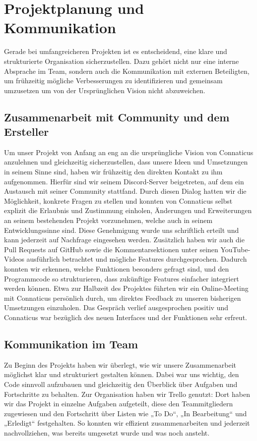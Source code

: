 \section{Projektplanung und Kommunikation}\label{sec:Absprache mit Ersteller und Community} 

Gerade bei umfangreicheren Projekten ist es entscheidend, eine klare und strukturierte Organisation
sicherzustellen. Dazu gehört nicht nur eine interne Absprache im Team, sondern auch die
Kommunikation mit externen Beteiligten, um frühzeitig mögliche Verbesserungen zu identifizieren und
gemeinsam umzusetzen um von der Ursprünglichen Vision nicht abzuweichen. 

\subsection{Zusammenarbeit mit Community und dem Ersteller}\label{sec:Zusammenarbeit mit Community und dem Ersteller} %

Um unser Projekt von Anfang an eng an die ursprüngliche Vision von Connaticus anzulehnen und
gleichzeitig sicherzustellen, dass unsere Ideen und Umsetzungen in seinem Sinne sind, haben wir
frühzeitig den direkten Kontakt zu ihm aufgenommen. Hierfür sind wir seinem Discord-Server
beigetreten, auf dem ein Austausch mit seiner Community stattfand. Durch diesen Dialog hatten wir
die Möglichkeit, konkrete Fragen zu stellen und konnten von Connaticus selbst explizit die Erlaubnis
und Zustimmung einholen, Änderungen und Erweiterungen an seinem bestehenden Projekt vorzunehmen,
welche auch in seinem Entwicklungssinne sind. Diese Genehmigung wurde uns schriftlich erteilt und
kann jederzeit auf Nachfrage eingesehen werden. Zusätzlich haben wir auch die Pull Requests auf
GitHub sowie die Kommentarsektionen unter seinen YouTube-Videos ausführlich betrachtet und mögliche
Features durchgesprochen. Dadurch konnten wir erkennen, welche Funktionen besonders gefragt sind,
und den Programmcode so strukturieren, dass zukünftige Features einfacher integriert werden können.
Etwa zur Halbzeit des Projektes führten wir ein Online-Meeting mit Connaticus persönlich durch, um
direktes Feedback zu unseren bisherigen Umsetzungen einzuholen. Das Gespräch verlief ausgesprochen
positiv und Connaticus war bezüglich des neuen Interfaces und der Funktionen sehr erfreut.

\subsection{Kommunikation im Team}

Zu Beginn des Projekts haben wir überlegt, wie wir unsere Zusammenarbeit möglichst klar und
strukturiert gestalten können. Dabei war uns wichtig, den Code sinnvoll aufzubauen und gleichzeitig
den Überblick über Aufgaben und Fortschritte zu behalten. Zur Organisation haben wir Trello genutzt:
Dort haben wir das Projekt in einzelne Aufgaben aufgeteilt, diese den Teammitgliedern zugewiesen und
den Fortschritt über Listen wie „To Do“, „In Bearbeitung“ und „Erledigt“ festgehalten. So konnten
wir effizient zusammenarbeiten und jederzeit nachvollziehen, was bereits umgesetzt wurde und was
noch ansteht.
